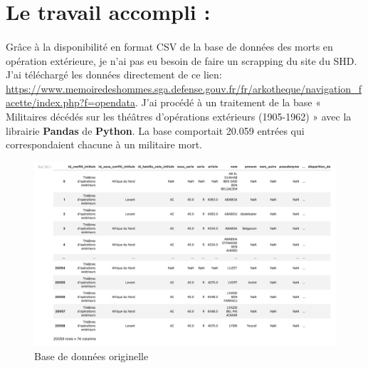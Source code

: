 \documentclass[12pt]{article}
\title{\vspace{-3cm}{Rapport sur les travaux de mon mémoire}}
\author{Theophile Miailhe}
\date{1/04/22}
\begin{document}
\maketitle

\section{Le travail accompli :}
\paragraph*{}
Grâce à la disponibilité en format CSV de la base de données des morts en opération extérieure, je n'ai pas eu besoin de faire un scrapping du site du SHD. J'ai téléchargé les données directement de ce lien: \url{https://www.memoiredeshommes.sga.defense.gouv.fr/fr/arkotheque/navigation_facette/index.php?f=opendata}. J'ai procédé à un traitement de la  base « Militaires décédés sur les théâtres d'opérations extérieurs (1905-1962) » avec la librairie \textbf{Pandas} de \textbf{Python}. La base comportait 20.059 entrées qui correspondaient chacune à un militaire mort.  
\begin{figure}[h]
    \centering
    \includegraphics[scale=0.27]{dbpic.png}
    \caption{Base de données originelle}
    \label{fig:Base d'origine}
\end{figure}
\end{document}

